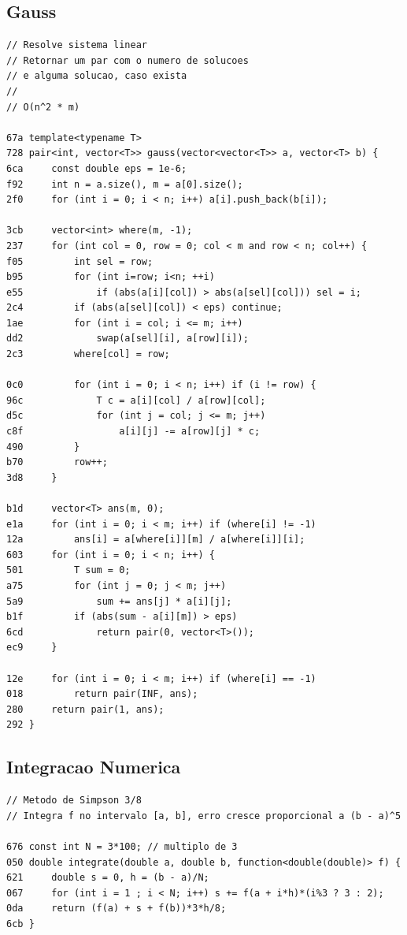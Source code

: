 \documentclass[11pt, a4paper, twoside]{article}
\begin{document}
\subsection{Gauss}
\begin{lstlisting}
// Resolve sistema linear
// Retornar um par com o numero de solucoes
// e alguma solucao, caso exista
//
// O(n^2 * m)

67a template<typename T>
728 pair<int, vector<T>> gauss(vector<vector<T>> a, vector<T> b) {
6ca 	const double eps = 1e-6;
f92 	int n = a.size(), m = a[0].size();
2f0 	for (int i = 0; i < n; i++) a[i].push_back(b[i]);
    
3cb 	vector<int> where(m, -1);
237 	for (int col = 0, row = 0; col < m and row < n; col++) {
f05 		int sel = row;
b95 		for (int i=row; i<n; ++i)
e55 			if (abs(a[i][col]) > abs(a[sel][col])) sel = i;
2c4 		if (abs(a[sel][col]) < eps) continue;
1ae 		for (int i = col; i <= m; i++)
dd2 			swap(a[sel][i], a[row][i]);
2c3 		where[col] = row;
    
0c0 		for (int i = 0; i < n; i++) if (i != row) {
96c 			T c = a[i][col] / a[row][col];
d5c 			for (int j = col; j <= m; j++)
c8f 				a[i][j] -= a[row][j] * c;
490 		}
b70 		row++;
3d8 	}
    
b1d 	vector<T> ans(m, 0);
e1a 	for (int i = 0; i < m; i++) if (where[i] != -1)
12a 		ans[i] = a[where[i]][m] / a[where[i]][i];
603 	for (int i = 0; i < n; i++) {
501 		T sum = 0;
a75 		for (int j = 0; j < m; j++)
5a9 			sum += ans[j] * a[i][j];
b1f 		if (abs(sum - a[i][m]) > eps)
6cd 			return pair(0, vector<T>());
ec9 	}
    
12e 	for (int i = 0; i < m; i++) if (where[i] == -1)
018 		return pair(INF, ans);
280 	return pair(1, ans);
292 }
\end{lstlisting}

\subsection{Integracao Numerica}
\begin{lstlisting}
// Metodo de Simpson 3/8
// Integra f no intervalo [a, b], erro cresce proporcional a (b - a)^5

676 const int N = 3*100; // multiplo de 3
050 double integrate(double a, double b, function<double(double)> f) {
621     double s = 0, h = (b - a)/N;
067     for (int i = 1 ; i < N; i++) s += f(a + i*h)*(i%3 ? 3 : 2);
0da     return (f(a) + s + f(b))*3*h/8;
6cb }
\end{lstlisting}
\end{document}
